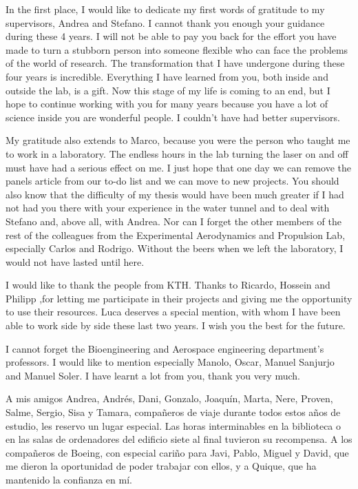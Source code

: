 \begin{acknowledgements}

In the first place, I would like to dedicate my first words of gratitude to my supervisors, Andrea and Stefano.
I cannot thank you enough your guidance during these 4 years.
I will not be able to pay you back for the effort you have made to turn a stubborn person into someone flexible who can face the problems of the world of research.
The transformation that I have undergone during these four years is incredible.
Everything I have learned from you, both inside and outside the lab, is a gift.
Now this stage of my life is coming to an end, but I hope to continue working with you for many years because you have a lot of science inside you are wonderful people.
I couldn't have had better supervisors.

My gratitude also extends to Marco, because you were the person who taught me to work in a laboratory.
The endless hours in the lab turning the laser on and off must have had a serious effect on me.
I just hope that one day we can remove the panels article from our to-do list and we can move to new projects.
You should also know that the difficulty of my thesis would have been much greater if I had not had you there with your experience in the water tunnel and to deal with Stefano and, above all, with Andrea.
Nor can I forget the other members of the rest of the colleagues from the Experimental Aerodynamics and Propulsion Lab, especially Carlos and Rodrigo.
Without the beers when we left the laboratory, I would not have lasted until here.

I would like to thank the people from KTH.
Thanks to Ricardo, Hossein and Philipp ,for letting me participate in their projects and giving me the opportunity to use their resources.
Luca deserves a special mention, with whom I have been able to work side by side these last two years.
I wish you the best for the future.

I cannot forget the Bioengineering and Aerospace engineering department's professors.
I would like to mention especially Manolo, Oscar, Manuel Sanjurjo and Manuel Soler.
I have learnt a lot from you, thank you very much.

A mis amigos Andrea, Andrés, Dani, Gonzalo, Joaquín, Marta, Nere, Proven, Salme, Sergio, Sisa y Tamara, compañeros de viaje durante todos estos años de estudio, les reservo un lugar especial.
Las horas interminables en la biblioteca o en las salas de ordenadores del edificio siete al final tuvieron su recompensa.
A los compañeros de Boeing, con especial cariño para Javi, Pablo, Miguel y David, que me dieron la oportunidad de poder trabajar con ellos, y a Quique, que ha mantenido la confianza en mí.


\end{acknowledgements}
